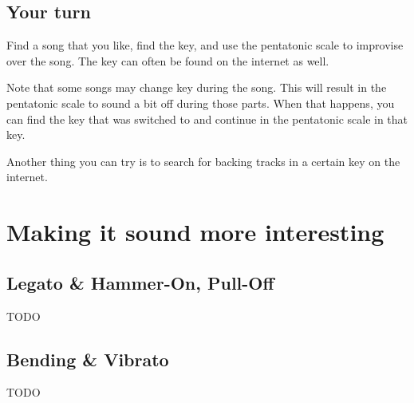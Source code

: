 \subsection{Your turn}

Find a song that you like, find the key, and use the pentatonic scale to improvise over the song. The key can often be found on the internet as well.

Note that some songs may change key during the song. This will result in the pentatonic scale to sound a bit off during those parts. When that happens, you can find the key that was switched to and continue in the pentatonic scale in that key.

Another thing you can try is to search for backing tracks in a certain key on the internet.

\newpage


\section{Making it sound more interesting}

\subsection{Legato \& Hammer-On, Pull-Off}
TODO

\subsection{Bending \& Vibrato}
TODO
